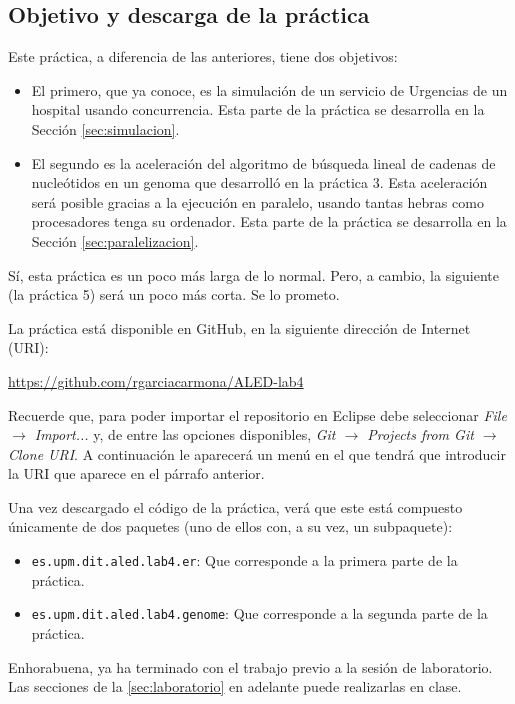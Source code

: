 \documentclass[10pt,a4paper,spanish]{article}
\newcommand{\code}[1]{\texttt{#1}}
\begin{document}
\subsection{Objetivo y descarga de la práctica}

Este práctica, a diferencia de las anteriores, tiene dos objetivos:

\begin{itemize}
    \item El primero, que ya conoce, es la simulación de un servicio de Urgencias de un hospital usando concurrencia. Esta parte de la práctica se desarrolla en la Sección \ref{sec:simulacion}.
    \item El segundo es la aceleración del algoritmo de búsqueda lineal de cadenas de nucleótidos en un genoma que desarrolló en la práctica 3. Esta aceleración será posible gracias a la ejecución en paralelo, usando tantas hebras como procesadores tenga su ordenador. Esta parte de la práctica se desarrolla en la Sección \ref{sec:paralelizacion}.
\end{itemize}

Sí, esta práctica es un poco más larga de lo normal. Pero, a cambio, la siguiente (la práctica 5) será un poco más corta. Se lo prometo.

La práctica está disponible en GitHub, en la siguiente dirección de Internet (URI):

\href{https://github.com/rgarciacarmona/ALED-lab4}{https://github.com/rgarciacarmona/ALED-lab4}

Recuerde que, para poder importar el repositorio en Eclipse debe seleccionar \textit{File $\to$ Import...} y, de entre las opciones disponibles, \textit{Git $\to$ Projects from Git $\to$ Clone URI}. A continuación le aparecerá un menú en el que tendrá que introducir la URI que aparece en el párrafo anterior.

Una vez descargado el código de la práctica, verá que este está compuesto únicamente de dos paquetes (uno de ellos con, a su vez, un subpaquete):

\begin{itemize}
    \item \code{es.upm.dit.aled.lab4.er}: Que corresponde a la primera parte de la práctica.
    \item \code{es.upm.dit.aled.lab4.genome}: Que corresponde a la segunda parte de la práctica.
\end{itemize}

Enhorabuena, ya ha terminado con el trabajo previo a la sesión de laboratorio. Las secciones de la \ref{sec:laboratorio} en adelante puede realizarlas en clase.
\end{document}
